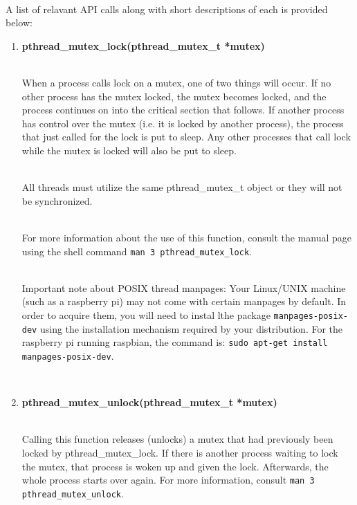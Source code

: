 \documentclass[12pt]{extarticle}
\newenvironment{myindentpar}[1]%
 {\begin{list}{}%
         {\setlength{\leftmargin}{#1}}%
         \item[]%
 }
 {\end{list}}
\newcommand{\code}[1]{\colorbox{codegray}{\texttt{#1}}}
\begin{document}
\begin{myindentpar}{5mm}
    \ \\
    A list of relavant API calls along with short descriptions of each is provided below:
    \begin{enumerate}
        \setlength\itemsep{-0.1em}

        \item \textbf{pthread\_mutex\_lock(pthread\_mutex\_t *mutex)}
        
        \ \\
        When a process calls lock on a mutex, one of two things will occur.  If no other process has the mutex locked, the mutex becomes locked, and the process continues on into the critical section that follows.  If another process has control over the mutex (i.e. it is locked by another process), the process that just called for the lock is put to sleep.  Any other processes that call lock while the mutex is locked will also be put to sleep.  
        
        \ \\
        All threads must utilize the same pthread\_mutex\_t object or they will not be synchronized.  
        
        \ \\
        For more information about the use of this function, consult the manual page using the shell command \code{man 3 pthread\_mutex\_lock}.  
        
        \ \\
        Important note about POSIX thread manpages: Your Linux/UNIX machine (such as a raspberry pi) may not come with certain manpages by default.  In order to acquire them, you will need to instal lthe package \code{manpages-posix-dev} using the installation mechanism required by your distribution.  For the raspberry pi running raspbian, the command is: \code{sudo apt-get install manpages-posix-dev}.  
        
        \vspace{-7mm}
        \ \\
        \item \textbf{pthread\_mutex\_unlock(pthread\_mutex\_t *mutex)}
        
        \ \\
        Calling this function releases (unlocks) a mutex that had previously been locked by pthread\_mutex\_lock.  If there is another process waiting to lock the mutex, that process is woken up and given the lock.  Afterwards, the whole process starts over again.  For more information, consult \code{man 3 pthread\_mutex\_unlock}.  
        

\end{enumerate}
\end{myindentpar}
\end{document}
